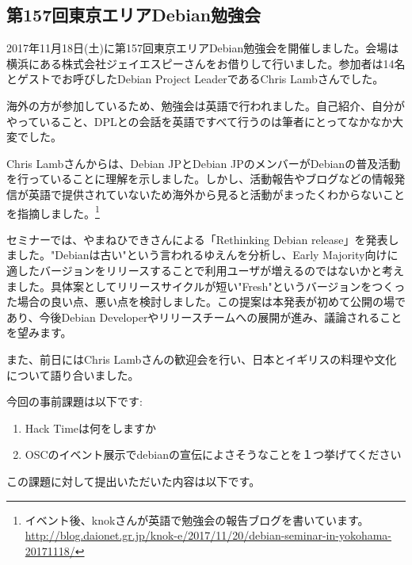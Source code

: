 \documentclass[mingoth,a4paper]{jsarticle}
\begin{document}

\subsection{第157回東京エリアDebian勉強会}

2017年11月18日(土)に第157回東京エリアDebian勉強会を開催しました。会場は横浜にある株式会社ジェイエスピーさんをお借りして行いました。参加者は14名とゲストでお呼びしたDebian Project LeaderであるChris Lambさんでした。


海外の方が参加しているため、勉強会は英語で行われました。自己紹介、自分がやっていること、DPLとの会話を英語ですべて行うのは筆者にとってなかなか大変でした。


Chris Lambさんからは、Debian JPとDebian JPのメンバーがDebianの普及活動を行っていることに理解を示しました。しかし、活動報告やブログなどの情報発信が英語で提供されていないため海外から見ると活動がまったくわからないことを指摘しました。\footnote{イベント後、knokさんが英語で勉強会の報告ブログを書いています。 \url{http://blog.daionet.gr.jp/knok-e/2017/11/20/debian-seminar-in-yokohama-20171118/}}


セミナーでは、やまねひできさんによる「Rethinking Debian release」を発表しました。"Debianは古い"という言われるゆえんを分析し、Early Majority向けに適したバージョンをリリースすることで利用ユーザが増えるのではないかと考えました。具体案としてリリースサイクルが短い"Fresh"というバージョンをつくった場合の良い点、悪い点を検討しました。この提案は本発表が初めて公開の場であり、今後Debian Developerやリリースチームへの展開が進み、議論されることを望みます。


また、前日にはChris Lambさんの歓迎会を行い、日本とイギリスの料理や文化について語り合いました。



今回の事前課題は以下です:
\begin{enumerate}
\item Hack Timeは何をしますか
\item OSCのイベント展示でdebianの宣伝によさそうなことを１つ挙げてください
\end{enumerate}
この課題に対して提出いただいた内容は以下です。
\begin{multicols}{2}
{\small

}
\end{multicols}

%
%
%
%
\end{document}
